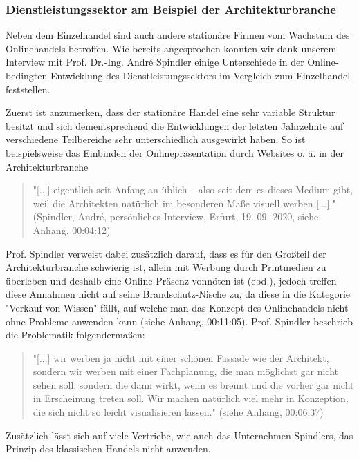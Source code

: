 \begin{folding} \subsubsection{Dienstleistungssektor am Beispiel der Architekturbranche}

Neben dem Einzelhandel sind auch andere stationäre Firmen vom Wachstum des Onlinehandels betroffen. Wie bereits angesprochen konnten wir dank unserem Interview mit Prof. Dr.-Ing. André Spindler einige Unterschiede in der Online-bedingten Entwicklung des Dienstleistungssektors im Vergleich zum Einzelhandel feststellen.

Zuerst ist anzumerken, dass der stationäre Handel eine sehr variable Struktur besitzt und sich dementsprechend die Entwicklungen der letzten Jahrzehnte auf verschiedene Teilbereiche sehr unterschiedlich ausgewirkt haben. So ist beispielsweise das Einbinden der Onlinepräsentation durch Websites o. ä. in der Architekturbranche

\begin{quote}
"[...] eigentlich seit Anfang an üblich – also seit dem es dieses Medium gibt, weil die Architekten natürlich im besonderen Maße visuell werben [...]." (Spindler, André, persönliches Interview, Erfurt, 19. 09. 2020, siehe Anhang, 00:04:12)
\end{quote} 
Prof. Spindler verweist dabei zusätzlich darauf, dass es für den Großteil der Architekturbranche schwierig ist, allein mit Werbung durch Printmedien zu überleben und deshalb eine Online-Präsenz vonnöten ist (ebd.), jedoch treffen diese Annahmen nicht auf seine Brandschutz-Nische zu, da diese in die Kategorie "Verkauf von Wissen" fällt, auf welche man das Konzept des Onlinehandels nicht ohne Probleme anwenden kann (siehe Anhang, 00:11:05). Prof. Spindler beschrieb die Problematik folgendermaßen:
\begin{quote}
"[...] wir werben ja nicht mit einer schönen Fassade wie der Architekt, sondern wir werben mit einer Fachplanung, die man möglichst gar nicht sehen soll, sondern die dann wirkt, wenn es brennt und die vorher gar nicht in Erscheinung treten soll. Wir machen natürlich viel mehr in Konzeption, die sich nicht so leicht visualisieren lassen." (siehe Anhang, 00:06:37)
\end{quote} 
Zusätzlich lässt sich auf viele Vertriebe, wie auch das Unternehmen Spindlers, das Prinzip des klassischen Handels nicht anwenden. 


\end{folding}
